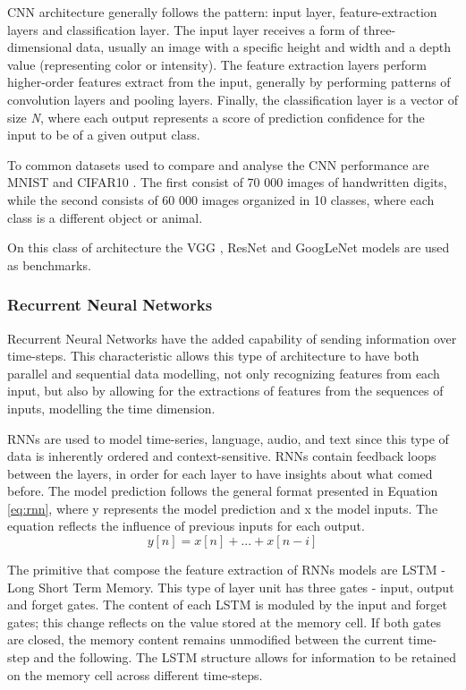 CNN architecture generally follows the pattern: input layer, feature-extraction layers and classification layer. The input layer receives a form of three-dimensional data, usually an image with a specific height and width and a depth value (representing color or intensity). The feature extraction layers perform higher-order features extract from the input, generally by performing patterns of convolution layers and pooling layers. Finally, the classification layer is a vector of size \textit{N}, where each output represents a score of prediction confidence for the input to be of a given output class.

To common datasets used to compare and analyse the CNN  performance are MNIST \cite{noauthor_mnist_1999} and CIFAR10 \cite{noauthor_cifar-10_2010}. The first consist of 70 000 images of handwritten digits, while the second consists of 60 000 images organized in 10 classes, where each class is a different object or animal.

On this class of architecture the VGG \cite{simonyan_very_2015}, ResNet \cite{he_deep_2015} and     GoogLeNet \cite{szegedy_going_2014} models are used as benchmarks.

\subsubsection{Recurrent Neural Networks}

Recurrent Neural Networks have the added capability of sending information over time-steps. This characteristic allows this type of architecture to have both parallel and sequential data modelling, not only recognizing features from each input, but also by allowing for the extractions of features from the sequences of inputs, modelling the time dimension. 

RNNs are used to model time-series, language, audio, and text since this type of data is inherently ordered and context-sensitive. RNNs contain feedback loops between the layers, in order for each layer to have insights about what comed before. The model prediction follows the general format presented in Equation \ref{eq:rnn}, where y represents the model prediction and x the model inputs. The equation reflects the influence of previous inputs for each output.
\begin{equation}
    \label{eq:rnn}
    y[n] = x[n] + ... + x[n-i]
\end{equation}

The primitive that compose the feature extraction of RNNs models are LSTM - Long Short Term Memory. This type of layer unit has three gates - input, output and forget gates. The content of each LSTM is moduled by the input and forget gates; this change reflects on the value stored at the memory cell. If both gates are closed, the memory content remains unmodified between the current time-step and the following. The LSTM structure allows for information to be retained on the memory cell across different time-steps.
